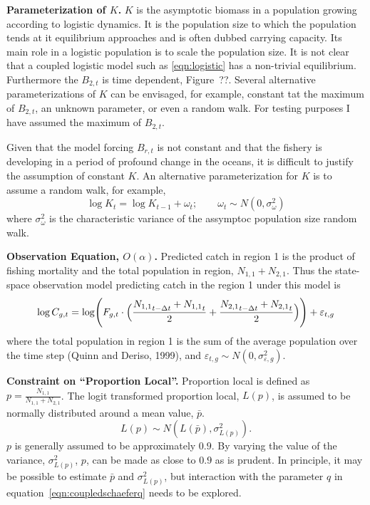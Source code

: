 \documentclass[12pt,letterpaper]{article}
\newcommand\None{{N_{1,1}}}
\newcommand\Ntwo{{N_{2,1}}}
\newcommand\Nsum{{N_{1,1}+N_{2,1}}}
\begin{document}
{\bf Parameterization of $K$.}
$K$ is the asymptotic biomass in a population growing according to
logistic dynamics. It is the population size to which the population
tends at it equilibrium approaches and is often dubbed carrying
capacity. Its main role in a logistic population is to scale the
population size. It is not clear that a coupled logistic model such as
\ref{eqn:logistic} has a non-trivial equilibrium. Furthermore the
$B_{2,t}$ is time dependent, Figure~??. Several alternative
parameterizations of $K$ can be envisaged, for example, constant tat
the maximum of $B_{2,t}$, an unknown parameter, or even a random walk.
For testing purposes I have assumed the maximum of $B_{2,t}$.

Given that the model forcing $B_{r,t}$ is not constant and that the
fishery is developing in a period of profound change in the oceans,
it is difficult to justify the assumption of constant $K$. An
alternative parameterization for $K$ is to assume a random walk, for
example,
\begin{equation}
\log K_t = \log K_{t-1} + \omega_t;\qquad \omega_t\sim
N(0,\sigma^2_\omega) \label{eqn:Kwalk}
\end{equation}
where  $\sigma^2_\omega$ is the characteristic variance of the
assymptoc population size random walk.

{\bf Observation Equation, $O(\alpha)$.}
Predicted catch in region 1 is the product of fishing mortality
and the total population in region, $\None+\Ntwo$.
Thus the state-space observation model predicting catch in the region 1
under this model is
\begin{equation}
\log C_{g,t} = \log \Biggl(F_{g,t}\cdot\Bigl(\frac{\None_{t-\Delta t}+\None_t}{2}
                           +\frac{\Ntwo_{t-\Delta
t}+\Ntwo_t}{2}\Bigr)\Biggr) + \varepsilon_{t,g}
\label{eqn:obs}
\end{equation}
where the total population in region 1 is the sum of the average
population over the time step (Quinn and Deriso, 1999), and
$\varepsilon_{t,g} \sim N(0,\sigma^2_{\varepsilon,g})$.

{\bf Constraint on ``Proportion Local''.}
Proportion local is defined as $p = \frac{\None}{\Nsum}$. The logit
transformed proportion local, $L(p)$, is assumed to be normally
distributed around a mean value, $\bar{p}$.
\begin{equation}
\label{eqn:LpropL}
L(p)\sim N(L(\bar{p}),\sigma^2_{L(p)}).
\end{equation} 
$p$ is generally assumed to be approximately $0.9$. By varying the
value of the variance, $\sigma^2_{L(p)}$, $p$, can be made as
close to $0.9$ as is prudent. In principle, it may be possible to
estimate $\bar{p}$ and $\sigma^2_{L(p)}$, but interaction with
the parameter $q$ in equation~\ref{eqn:coupledschaeferq} needs to be
explored.
\end{document}
